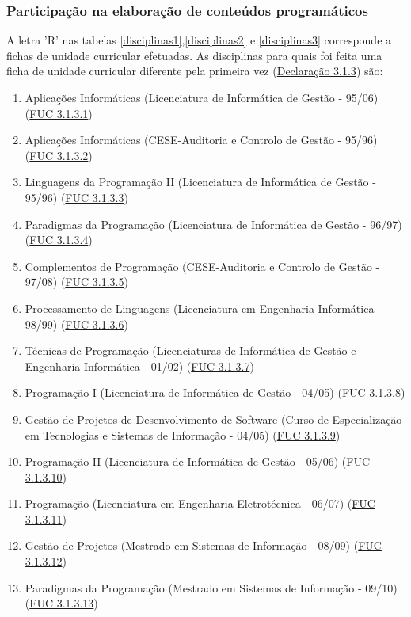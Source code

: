 \documentclass[11pt]{article}
\begin{document}
\subsubsection{Participação na elaboração de conteúdos programáticos}
A letra 'R' nas tabelas \ref{disciplinas1},\ref{disciplinas2} e \ref{disciplinas3} corresponde a fichas de unidade curricular efetuadas.
As disciplinas para quais foi feita uma ficha de unidade curricular diferente pela primeira vez (\href{run:Disciplinas/FUCs.pdf}{Declaração 3.1.3}) são:
\begin{enumerate}
\item {Aplicações Informáticas (Licenciatura de Informática de Gestão - 95/06) (\href{run:Disciplinas/Fichas/APLICINF9596IG.pdf}{FUC 3.1.3.1})}
\item {Aplicações Informáticas (CESE-Auditoria e Controlo de Gestão - 95/96) (\href{run:Disciplinas/Fichas/AplicInf9596.pdf}{FUC 3.1.3.2}) }
\item {Linguagens da Programação II (Licenciatura de Informática de Gestão - 95/96) (\href{run:Disciplinas/Fichas/LPII9596.pdf}{FUC 3.1.3.3}) }
\item {Paradigmas da Programação (Licenciatura de Informática de Gestão - 96/97) (\href{run:Disciplinas/Fichas/PP9697.pdf}{FUC 3.1.3.4})}
\item {Complementos de Programação (CESE-Auditoria e Controlo de Gestão - 97/08) (\href{run:Disciplinas/Fichas/CP9798.pdf}{FUC 3.1.3.5}) }
\item {Processamento de Linguagens (Licenciatura em Engenharia Informática - 98/99) (\href{run:Disciplinas/Fichas/PL9899.pdf}{FUC 3.1.3.6})}
\item {Técnicas de Programação (Licenciaturas de Informática de Gestão e Engenharia Informática - 01/02) (\href{run:Disciplinas/Fichas/TP0102.pdf}{FUC 3.1.3.7})}
\item {Programação I (Licenciatura de Informática de Gestão - 04/05) (\href{run:Disciplinas/Fichas/ProgI0405.pdf}{FUC 3.1.3.8}) }
\item {Gestão de Projetos de Desenvolvimento de Software (Curso de Especialização em Tecnologias e Sistemas de Informação - 04/05) (\href{run:Disciplinas/Fichas/GPDSWCETSI0405.pdf}{FUC 3.1.3.9})}
\item {Programação II (Licenciatura de Informática de Gestão - 05/06) (\href{run:Disciplinas/Fichas/ProgII0506.pdf}{FUC 3.1.3.10}) }
\item {Programação (Licenciatura em Engenharia Eletrotécnica - 06/07) (\href{run:Disciplinas/Fichas/ProgEE0607.pdf}{FUC 3.1.3.11})}
\item {Gestão de Projetos (Mestrado em Sistemas de Informação - 08/09) (\href{run:Disciplinas/Fichas/GestaoProjetos.pdf}{FUC 3.1.3.12})}
\item {Paradigmas da Programação (Mestrado em Sistemas de Informação - 09/10) (\href{run:Disciplinas/Fichas/PP0910.pdf}{FUC 3.1.3.13})}
\end{enumerate}
\end{document}
